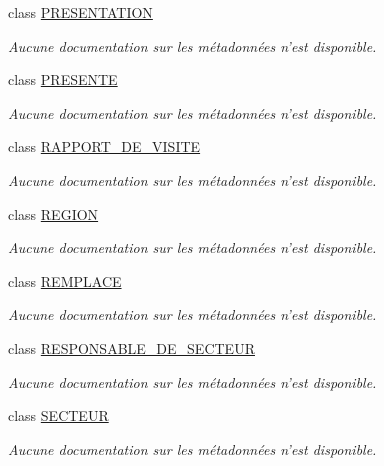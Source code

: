 \begin{DoxyCompactItemize}
class \hyperlink{class_model_1_1_p_r_e_s_e_n_t_a_t_i_o_n}{P\-R\-E\-S\-E\-N\-T\-A\-T\-I\-O\-N}
\begin{DoxyCompactList}\small\item\em Aucune documentation sur les métadonnées n'est disponible. \end{DoxyCompactList}\item 
class \hyperlink{class_model_1_1_p_r_e_s_e_n_t_e}{P\-R\-E\-S\-E\-N\-T\-E}
\begin{DoxyCompactList}\small\item\em Aucune documentation sur les métadonnées n'est disponible. \end{DoxyCompactList}\item 
class \hyperlink{class_model_1_1_r_a_p_p_o_r_t___d_e___v_i_s_i_t_e}{R\-A\-P\-P\-O\-R\-T\-\_\-\-D\-E\-\_\-\-V\-I\-S\-I\-T\-E}
\begin{DoxyCompactList}\small\item\em Aucune documentation sur les métadonnées n'est disponible. \end{DoxyCompactList}\item 
class \hyperlink{class_model_1_1_r_e_g_i_o_n}{R\-E\-G\-I\-O\-N}
\begin{DoxyCompactList}\small\item\em Aucune documentation sur les métadonnées n'est disponible. \end{DoxyCompactList}\item 
class \hyperlink{class_model_1_1_r_e_m_p_l_a_c_e}{R\-E\-M\-P\-L\-A\-C\-E}
\begin{DoxyCompactList}\small\item\em Aucune documentation sur les métadonnées n'est disponible. \end{DoxyCompactList}\item 
class \hyperlink{class_model_1_1_r_e_s_p_o_n_s_a_b_l_e___d_e___s_e_c_t_e_u_r}{R\-E\-S\-P\-O\-N\-S\-A\-B\-L\-E\-\_\-\-D\-E\-\_\-\-S\-E\-C\-T\-E\-U\-R}
\begin{DoxyCompactList}\small\item\em Aucune documentation sur les métadonnées n'est disponible. \end{DoxyCompactList}\item 
class \hyperlink{class_model_1_1_s_e_c_t_e_u_r}{S\-E\-C\-T\-E\-U\-R}
\begin{DoxyCompactList}\small\item\em Aucune documentation sur les métadonnées n'est disponible. \end{DoxyCompactList}\item 

\end{DoxyCompactItemize}
